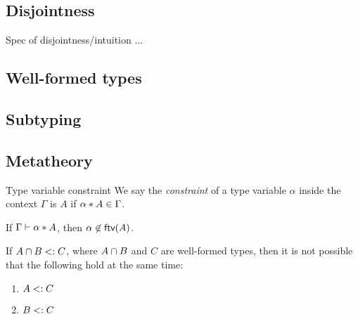 \documentclass[nocopyrightspace,preprint,times,9pt]{sigplanconf}
\begin{document}
\subsection{Disjointness}

Spec of disjointness/intuition ...

\subsection{Well-formed types}

\subsection{Subtyping}

\subsection{Metatheory}

\begin{definition}{Type variable constraint}
We say the \emph{constraint} of a type variable $\alpha$ inside the context $\Gamma$ is $A$ if $\alpha * A \in \Gamma$.
\end{definition}

%

\begin{lemma} \label{free-var-disjoint-bounds}
  If $\Gamma \vdash \alpha * A$, then $\alpha \not \in \textsf{ftv}(A)$.
\end{lemma}

\begin{lemma} \label{unique-subtype-contributor}
If $A \cap B <: C$, where $A \cap B$ and $C$ are well-formed types, then it is not possible that the following hold at the same time:
\begin{enumerate}
\item $A <: C$
\item $B <: C$
\end{enumerate}
\end{lemma}
\end{document}
